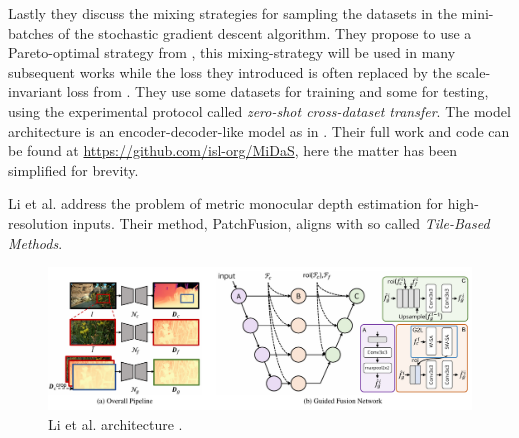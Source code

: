 Lastly they discuss the mixing strategies for sampling the datasets in the mini-batches of the stochastic gradient descent algorithm.
They propose to use a Pareto-optimal strategy from \cite{pareto}, this mixing-strategy will be used in many subsequent works while the loss they introduced is often replaced by the scale-invariant loss from \cite{Eigen}.
They use some datasets for training and some for testing, using the experimental protocol called \textit{zero-shot cross-dataset transfer}.
The model architecture is an encoder-decoder-like model as in \cite{ReDWeb}. Their full work and code can be found at \url{https://github.com/isl-org/MiDaS}, here the matter has been simplified for brevity.

Li et al. \cite{PatchFusion} address the problem of metric monocular depth estimation for high-resolution inputs.
Their method, PatchFusion, aligns with so called \textit{Tile-Based Methods}.

\begin{figure}
	\centering
	\includegraphics[scale=0.3]{figs/patchfusion}
	\caption{Li et al. architecture \cite{PatchFusion}. \label{fig:patchfusion}}
\end{figure}

